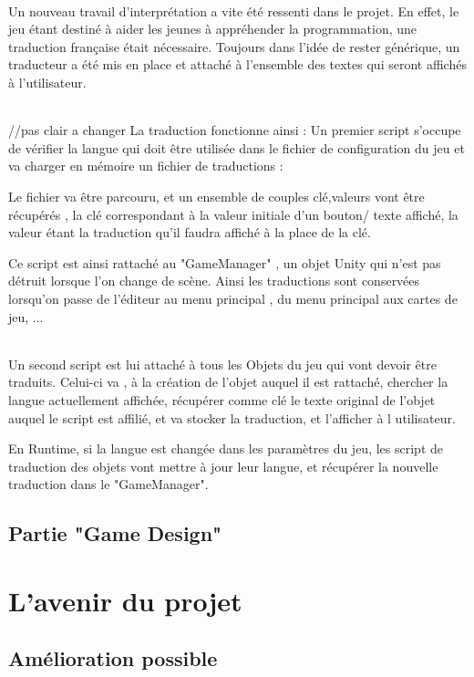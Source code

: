 \documentclass{report}
\begin{document}
\paragraph{}
Un nouveau travail d'interprétation a vite été ressenti dans le projet. En effet, le jeu étant destiné à aider les jeunes à appréhender la programmation, une traduction française était nécessaire.
Toujours dans l'idée de rester générique, un traducteur a été mis en place et attaché à l'ensemble des textes qui seront affichés à l'utilisateur.
\paragraph{}
//pas clair a changer
La traduction fonctionne ainsi :
Un premier script s'occupe de vérifier la langue qui doit être utilisée dans le fichier de configuration du jeu et va charger en mémoire un fichier  de traductions : 

Le fichier va être parcouru, et un ensemble de couples clé,valeurs vont être récupérés , la clé correspondant à la valeur initiale d'un bouton/ texte affiché, la valeur étant la traduction qu'il faudra affiché à la place de la clé.

Ce script est ainsi rattaché au "GameManager" , un objet Unity qui n'est pas détruit lorsque l'on change de scène. Ainsi les traductions sont conservées lorsqu'on passe de l'éditeur au menu principal , du menu principal aux cartes de jeu, ...
\paragraph{}
Un second script est lui attaché à tous les Objets du jeu qui vont devoir être traduits. Celui-ci va , à la création de l'objet auquel il est rattaché, chercher la langue actuellement affichée, récupérer comme clé le texte original de l'objet auquel le script est affilié, et va stocker la traduction, et l'afficher à l utilisateur.

En Runtime, si la langue est changée dans les paramètres du jeu, les script de traduction des objets vont mettre à jour leur langue, et récupérer la nouvelle traduction dans le "GameManager".
\newpage
\chapter{Partie "Game Design"}

\newpage
\part{L'avenir du projet}
\chapter{Amélioration possible}

%
%
\end{document}
